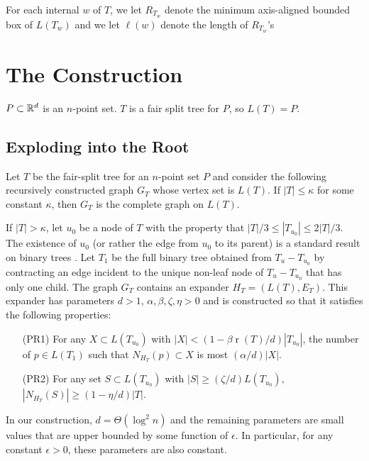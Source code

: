 \documentclass{patmorin}
\DeclareMathOperator{\rank}{r}
\begin{document}
For each internal $w$ of $T$, we let $R_{T_w}$ denote the minimum axis-aligned bounded box of $L(T_w)$ and we let $\ell(w)$ denote the length of $R_{T_w}$'s







\section{The Construction}

$P\subset \mathbb{R}^d$ is an $n$-point set.  $T$ is a fair split tree for $P$,
so $L(T)=P$.

\subsection{Exploding into the Root}

Let $T$ be the fair-split tree for an $n$-point set $P$ and consider
the following recursively constructed graph $G_{T}$ whose vertex set
is $L(T)$.  If $|T| \le \kappa$ for some constant $\kappa$, then $G_T$
is the complete graph on $L(T)$.

If $|T|>\kappa$, let $u_0$ be a node of $T$ with the property that
$|T|/3\le |T_{u_0}|\le 2|T|/3$.  The existence of $u_0$ (or rather
the edge from $u_0$ to its parent) is a standard result on binary
trees \cite{X}.  Let $T_1$ be the full binary tree obtained from
$T_u-T_{u_0}$ by contracting an edge incident to the unique non-leaf node
of $T_u-T_{u_0}$ that has only one child.  The graph $G_{T}$ contains
an expander $H_T=(L(T),E_T)$. This expander has parameters $d>1$,
$\alpha, \beta,\zeta,\eta > 0$ and is constructed so that it satisfies
the following properties:
\begin{enumerate}
	\item[(PR1)] For any $X\subset L(T_{u_0})$ with
  $|X|<(1-\beta\rank(T)/d)|T_{u_0}|$, the number of $p\in L(T_1)$ such
  that $N_{H_T}(p)\subset X$ is most $(\alpha/d)|X|$.

   \item[(PR2)] For any set $S\subset L(T_{u_0})$ with $|S|\ge (\zeta/d)L(T_{u_0})$, $|N_{H_T}(S)|\ge (1-\eta/d)|T|$.
\end{enumerate}
In our construction, $d=\Theta(\log^2 n)$ and the remaining parameters
are small values that are upper bounded by some function of $\epsilon$. In particular, for any constant $\epsilon >0$, these parameters are also constant.
\end{document}
